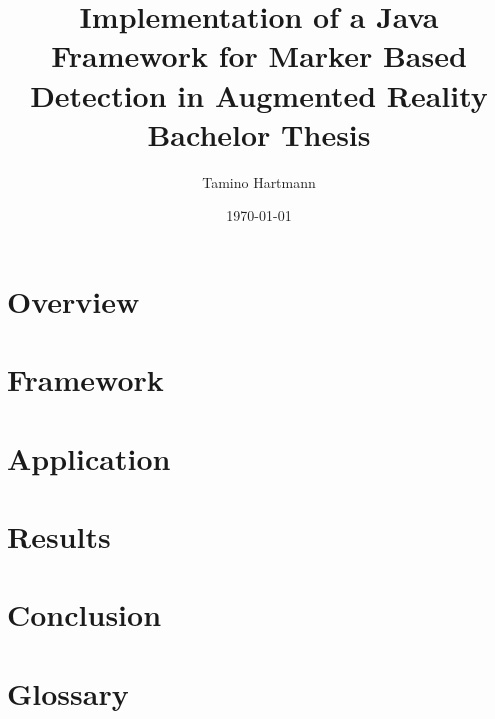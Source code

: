 \documentclass[a4paper,twoside]{article}
\begin{document}
\title{Implementation of a Java Framework for Marker Based Detection in Augmented Reality \\ {\large Bachelor Thesis}}
\author{Tamino Hartmann}
\date{\today}

\maketitle
\thispagestyle{empty}



\newpage
\mbox{}

\newpage

\tableofcontents

\newpage
\section{Overview}

\newpage
\section{Framework}

\newpage
\section{Application}

\newpage
\section{Results}

\newpage
\section{Conclusion}

\newpage
\section*{Glossary}


\listoffigures

\end{document}
